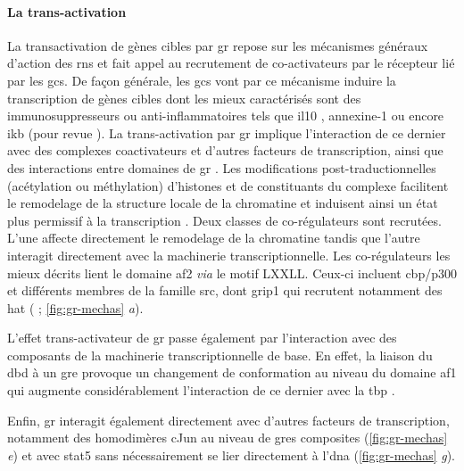 \documentclass[../main.tex]{subfiles}
\begin{document}
\paragraph{La trans-activation}
La transactivation de gènes cibles par \gls{gr} repose sur les mécanismes généraux d'action des \glspl{rn} et fait appel au recrutement de co-activateurs par le récepteur lié par les \glspl{gc}.
De façon générale, les \glspl{gc} vont par ce mécanisme induire la transcription de gènes cibles dont les mieux caractérisés sont des immunosuppresseurs ou anti-inflammatoires tels que \gls{il10} \citep{Mozo2004}, annexine-1 \citep{Philip1997} ou encore \gls{ikb} \citep{Auphan1995} (pour revue \citealp{Newton2000}).
La trans-activation par \gls{gr} implique l'interaction de ce dernier avec des complexes coactivateurs et d'autres facteurs de transcription, ainsi que des interactions entre domaines de \gls{gr} \citep{Bledsoe2002,Kumar2005}.
Les modifications post-traductionnelles (acétylation ou méthylation) d'histones et de constituants du complexe facilitent le remodelage de la structure locale de la chromatine et induisent ainsi un état plus permissif à la transcription \citep{Aranda2001}.
Deux classes de co-régulateurs sont recrutées.
L'une affecte directement le remodelage de la chromatine tandis que l'autre interagit directement avec la machinerie transcriptionnelle.
Les co-régulateurs les mieux décrits lient le domaine \gls{af2} \textit{via} le motif LXXLL.
Ceux-ci incluent \gls{cbp}/p300 et différents membres de la famille \gls{src}, dont \gls{grip1} qui recrutent notamment des \gls{hat} (\citep{Fryer1998} ; \autoref{fig:gr-mechas} \textit{a}).



L'effet trans-activateur de \gls{gr} passe également par l'interaction avec des composants de la machinerie transcriptionnelle de base.
En effet, la liaison du \gls{dbd} à un \gls{gre} provoque un changement de conformation au niveau du domaine \gls{af1} qui augmente considérablement l'interaction de ce dernier avec la \gls{tbp} \citep{Kumar2004}.
\par
Enfin, \gls{gr} interagit également directement avec d'autres facteurs de transcription, notamment des homodimères cJun au niveau de \glspl{gre} composites (\autoref{fig:gr-mechas} \textit{e}) et avec \gls{stat5} \citep{Stoecklin1997} sans nécessairement se lier directement à l'\gls{dna} (\autoref{fig:gr-mechas} \textit{g}).
\end{document}

